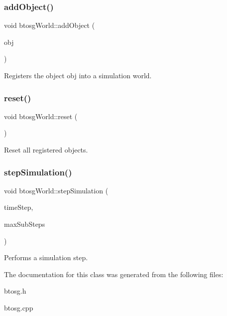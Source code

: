 \subsubsection{\texorpdfstring{add\+Object()}{addObject()}}
{\footnotesize\ttfamily void btosg\+World\+::add\+Object (\begin{DoxyParamCaption}\item[{class \hyperlink{classbtosgObject}{btosg\+Object} $\ast$}]{obj }\end{DoxyParamCaption})}

Registers the object obj into a simulation world. \mbox{\label{classbtosgWorld_a6af4d066410a86b44fff5563667ea9a9}} 
\subsubsection{\texorpdfstring{reset()}{reset()}}
{\footnotesize\ttfamily void btosg\+World\+::reset (\begin{DoxyParamCaption}{ }\end{DoxyParamCaption})}

Reset all registered objects. \mbox{\label{classbtosgWorld_afce096686d8f84afd8b8fa3f2dc161b8}} 
\subsubsection{\texorpdfstring{step\+Simulation()}{stepSimulation()}}
{\footnotesize\ttfamily void btosg\+World\+::step\+Simulation (\begin{DoxyParamCaption}\item[{bt\+Scalar}]{time\+Step,  }\item[{int}]{max\+Sub\+Steps }\end{DoxyParamCaption})}

Performs a simulation step. 

The documentation for this class was generated from the following files\+:\begin{DoxyCompactItemize}
\item 
btosg.\+h\item 
btosg.\+cpp\end{DoxyCompactItemize}
